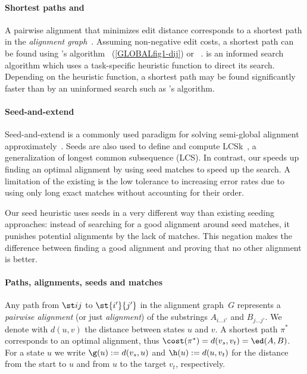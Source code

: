 \paragraph{Shortest paths and \A}
A pairwise alignment that minimizes edit distance corresponds to a shortest path
in the \emph{alignment graph}~\citep{vintsyuk1968speech,ukkonen1985algorithms}.
Assuming non-negative edit costs, a shortest path can be found using \dijkstra's
algorithm~\citep{ukkonen1985algorithms} (\cref{GLOBALfig1-dij}) or
\A~\citep{spouge1989speeding}. \A is an informed search algorithm which uses a
task-specific heuristic function to direct its search. Depending on the
heuristic function, a shortest path may be found significantly faster than by an
uninformed search such as \dijkstra's algorithm.

%

\paragraph{Seed-and-extend}
Seed-and-extend is a commonly used paradigm for solving semi-global alignment
approximately~\citep{kucherov2019evolution}. Seeds are also used to define and
compute LCSk~\citep{benson2014longest}, a generalization of longest common
subsequence (LCS). In contrast, our \emph{\sh} speeds up finding an optimal
alignment by using seed matches to speed up the \A search. A limitation of the
existing \sh is the low tolerance to increasing error rates due to using only
long exact matches without accounting for their order.

Our seed heuristic uses seeds in a very different way than existing seeding
approaches: instead of searching for a good alignment around seed matches, it
punishes potential alignments by the lack of matches. This negation makes the
difference between finding a good alignment and proving that no other alignment
is better.

\paragraph{Paths, alignments, seeds and matches}
Any path from $\st ij$ to $\st{i'}{j'}$ in the alignment graph~$G$ represents a
\emph{pairwise alignment} (or just \emph{alignment}) of the substrings $A_{i
\dots i'}$ and $B_{j \dots j'}$. We denote with $d(u,v)$ the distance between
states $u$ and $v$. A shortest path $\pi^*$ corresponds to an optimal alignment,
thus $\cost(\pi^*) = d(v_s, v_t) = \ed(A, B)$. For a state $u$ we write $\g(u)
:= d(v_s, u)$ and $\h(u) := d(u, v_t)$ for the distance from the start to $u$
and from $u$ to the target $v_t$, respectively.


